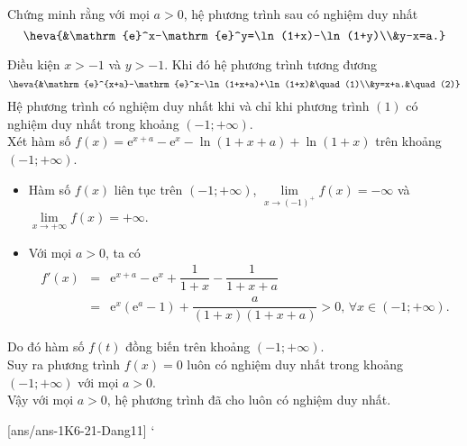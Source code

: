 \begin{bt}%
	Chứng minh rằng với mọi $a>0$, hệ phương trình sau có nghiệm duy nhất
	$$\heva{&\mathrm{e}^x-\mathrm{e}^y=\ln (1+x)-\ln (1+y)\\&y-x=a.}$$
	\loigiai
	{Điều kiện $x>-1$ và $y>-1$. Khi đó hệ phương trình tương đương
		$$\heva{&\mathrm{e}^{x+a}-\mathrm{e}^x-\ln (1+x+a)+\ln (1+x)&\quad (1)\\&y=x+a.&\quad (2)}$$
		Hệ phương trình có nghiệm duy nhất khi và chỉ khi phương trình $(1)$ có nghiệm duy nhất trong khoảng $(-1;+\infty)$.\\
		Xét hàm số $f(x)=\mathrm{e}^{x+a}-\mathrm{e}^x-\ln (1+x+a)+\ln (1+x)$ trên khoảng $(-1;+\infty)$.
		\begin{itemize}
			\item Hàm số $f(x)$ liên tục trên $(-1;+\infty)$, $\lim\limits_{x \to (-1)^+} f(x)=-\infty$ và $\lim\limits_{x \to +\infty} f(x)=+\infty$.
			\item Với mọi $a>0$, ta có
			\allowdisplaybreaks
			\begin{eqnarray*}
				f'(x) &=& \mathrm{e}^{x+a}-\mathrm{e}^x+\dfrac{1}{1+x}-\dfrac{1}{1+x+a}\\
				&=& \mathrm{e}^{x}\left(\mathrm{e}^a-1\right) +\dfrac{a}{(1+x)(1+x+a)}>0,\, \forall x\in (-1;+\infty).
			\end{eqnarray*}
		\end{itemize}
		Do đó hàm số $f(t)$ đồng biến trên khoảng $(-1;+\infty)$.\\
		Suy ra phương trình $f(x)=0$ luôn có nghiệm duy nhất trong khoảng $(-1;+\infty)$ với mọi $a>0$.\\
		Vậy với mọi $a>0$, hệ phương trình đã cho luôn có nghiệm duy nhất.
	}
\end{bt}
\centerline{}
[ans/ans-1K6-21-Dang11]
`

